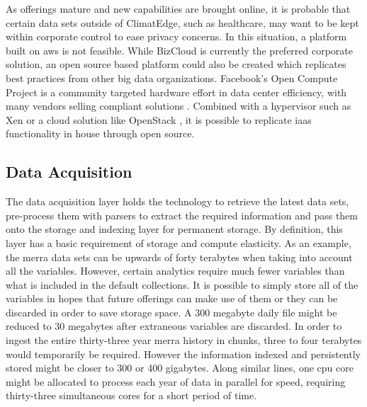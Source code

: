 As offerings mature and new capabilities are brought online, it is probable that certain data sets outside of ClimatEdge, such as healthcare, may want to be kept within corporate control to ease privacy concerns. In this situation, a platform built on \gls{aws} is not feasible. While BizCloud is currently the preferred corporate solution, an open source based platform could also be created which replicates best practices from other big data organizations. Facebook's Open Compute Project is a community targeted hardware effort in data center efficiency, with many vendors selling compliant solutions \cite{opencompute}. Combined with a hypervisor such as Xen \cite{xen} or a cloud solution like OpenStack \cite{openstack}, it is possible to replicate \gls{iaas} functionality in house through open source.
\subsection{Data Acquisition}
The data acquisition layer holds the technology to retrieve the latest data sets, pre-process them with parsers  to extract the required information and pass them onto the storage and indexing layer for permanent storage. By definition, this layer has a basic requirement of storage and compute elasticity. As an example, the \gls{merra} data sets can be upwards of forty terabytes when taking into account all the variables. However, certain analytics require much fewer variables than what is included in the default collections. It is possible to simply store all of the variables in hopes that future offerings can make use of them or they can be discarded in order to save storage space. A 300 megabyte daily file might be reduced to 30 megabytes after extraneous variables are discarded.  In order to ingest the entire thirty-three year \gls{merra} history in chunks, three to four terabytes would  temporarily be required. However the information indexed and persistently stored might be closer to 300 or 400 gigabytes. Along similar lines, one \gls{cpu} core might be allocated to process each year of data in parallel for speed, requiring thirty-three simultaneous cores for a short period of time. \\


